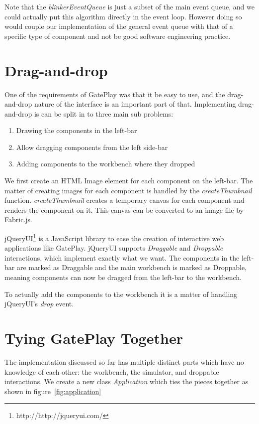 Note that the \textit{blinkerEventQueue} is just a subset of the main event queue, and we could actually put this algorithm directly in the event loop. However doing so would couple our implementation of the general event queue with that of a specific type of component and not be good software engineering practice.

\section{Drag-and-drop}
One of the requirements of GatePlay was that it be easy to use, and the drag-and-drop nature of the interface is an important part of that. Implementing drag-and-drop is can be split in to three main sub problems:

\begin{enumerate}
	\item Drawing the components in the left-bar
	\item Allow dragging components from the left side-bar
	\item Adding components to the workbench where they dropped
\end{enumerate}

We first create an HTML Image element for each component on the left-bar. The matter of creating images for each component is handled by the  \textit{createThumbnail} function. \textit{createThumbnail} creates a temporary canvas for each component and renders the component on it. This canvas can be converted to an image file by Fabric.js.

jQueryUI\footnote{http://http://jqueryui.com/} is a JavaScript library to ease the creation of interactive web applications like GatePlay. jQueryUI supports \textit{Draggable} and \textit{Droppable} interactions, which implement exactly what we want. The components in the left-bar are marked as Draggable and the main workbench is marked as Droppable, meaning components can now be dragged from the left-bar to the workbench.

To actually add the components to the workbench it is a matter of handling jQueryUI's \textit{drop} event.

\section{Tying GatePlay Together}
The implementation discussed so far has multiple distinct parts which have no knowledge of each other: the workbench, the simulator, and droppable interactions. We create a new class \textit{Application} which ties the pieces together as shown in figure~\ref{fig:application}

